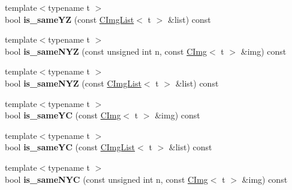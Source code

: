 \begin{DoxyCompactItemize}
\item 
\hypertarget{structcimg__library_1_1CImgList_a4c7f51760565ceeed10210643af682d3}{
{\footnotesize template$<$typename t $>$ }\\bool {\bfseries is\_\-sameYZ} (const \hyperlink{structcimg__library_1_1CImgList}{CImgList}$<$ t $>$ \&list) const }
\label{structcimg__library_1_1CImgList_a4c7f51760565ceeed10210643af682d3}

\item 
\hypertarget{structcimg__library_1_1CImgList_a8e64a2539676a58f7cff1842ff9eb674}{
{\footnotesize template$<$typename t $>$ }\\bool {\bfseries is\_\-sameNYZ} (const unsigned int n, const \hyperlink{structcimg__library_1_1CImg}{CImg}$<$ t $>$ \&img) const }
\label{structcimg__library_1_1CImgList_a8e64a2539676a58f7cff1842ff9eb674}

\item 
\hypertarget{structcimg__library_1_1CImgList_a8b2db25d02f89308860b27b511aaad03}{
{\footnotesize template$<$typename t $>$ }\\bool {\bfseries is\_\-sameNYZ} (const \hyperlink{structcimg__library_1_1CImgList}{CImgList}$<$ t $>$ \&list) const }
\label{structcimg__library_1_1CImgList_a8b2db25d02f89308860b27b511aaad03}

\item 
\hypertarget{structcimg__library_1_1CImgList_a39fea71206b4c4dc9b80575950fc2ece}{
{\footnotesize template$<$typename t $>$ }\\bool {\bfseries is\_\-sameYC} (const \hyperlink{structcimg__library_1_1CImg}{CImg}$<$ t $>$ \&img) const }
\label{structcimg__library_1_1CImgList_a39fea71206b4c4dc9b80575950fc2ece}

\item 
\hypertarget{structcimg__library_1_1CImgList_a34d33dd885421fa5a92e97ad80ccd68f}{
{\footnotesize template$<$typename t $>$ }\\bool {\bfseries is\_\-sameYC} (const \hyperlink{structcimg__library_1_1CImgList}{CImgList}$<$ t $>$ \&list) const }
\label{structcimg__library_1_1CImgList_a34d33dd885421fa5a92e97ad80ccd68f}

\item 
\hypertarget{structcimg__library_1_1CImgList_adc1d19f5529d2946720c41c52aabfeb7}{
{\footnotesize template$<$typename t $>$ }\\bool {\bfseries is\_\-sameNYC} (const unsigned int n, const \hyperlink{structcimg__library_1_1CImg}{CImg}$<$ t $>$ \&img) const }
\label{structcimg__library_1_1CImgList_adc1d19f5529d2946720c41c52aabfeb7}


\end{DoxyCompactItemize}
